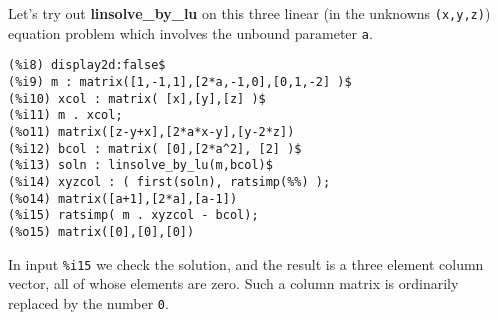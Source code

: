 \documentclass[12pt]{article}
\begin{document}
\smallskip
Let's try out \textbf{linsolve\_by\_lu} on this three linear (in the
  unknowns \verb|(x,y,z)|) equation problem which involves the unbound
  parameter \verb|a|.
\small
\begin{verbatim}
(%i8) display2d:false$
(%i9) m : matrix([1,-1,1],[2*a,-1,0],[0,1,-2] )$
(%i10) xcol : matrix( [x],[y],[z] )$
(%i11) m . xcol;
(%o11) matrix([z-y+x],[2*a*x-y],[y-2*z])
(%i12) bcol : matrix( [0],[2*a^2], [2] )$
(%i13) soln : linsolve_by_lu(m,bcol)$
(%i14) xyzcol : ( first(soln), ratsimp(%%) );
(%o14) matrix([a+1],[2*a],[a-1])
(%i15) ratsimp( m . xyzcol - bcol);
(%o15) matrix([0],[0],[0])
\end{verbatim}
\normalsize
In input \verb|%i15| we check the solution, and the result is a three element
  column vector, all of whose elements are zero.
Such a column matrix is ordinarily replaced by the number \verb|0|.\\

  
\end{document}
